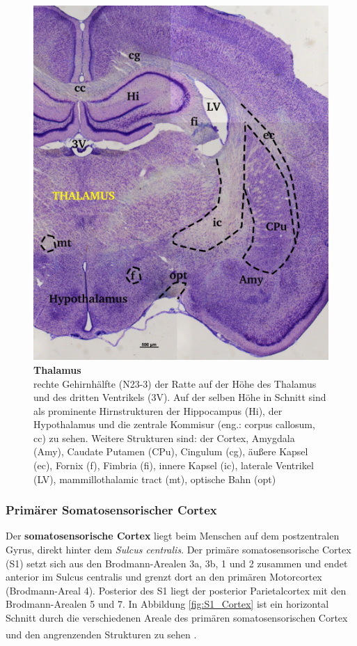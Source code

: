 \documentclass[12pt,a4paper,pdftex]{article}
\begin{document}
\begin{figure}[H]
    \centering
    \includegraphics{pictures/somatosensory/thalamus_somato.png}
    \caption[Thalamus]{\textbf{Thalamus}\\
    rechte Gehirnhälfte (N23-3) der Ratte auf der Höhe des Thalamus und des dritten Ventrikels (3V). Auf der selben Höhe in Schnitt sind als prominente Hirnstrukturen der Hippocampus (Hi), der Hypothalamus und die zentrale Kommisur (eng.: corpus callosum, cc) zu sehen. Weitere Strukturen sind: der Cortex, Amygdala (Amy), Caudate Putamen (CPu), Cingulum (cg), äußere Kapsel (ec), Fornix (f), Fimbria (fi), innere Kapsel (ic), laterale Ventrikel (LV), mammillothalamic tract (mt), optische Bahn (opt)}
    \label{fig:thalamus_somato}
\end{figure}

\subsubsection*{Primärer Somatosensorischer Cortex}
\label{subsubsec:S1}
Der \textbf{somatosensorische Cortex}  liegt beim Menschen auf dem postzentralen Gyrus, direkt hinter dem \textit{Sulcus centralis}. Der primäre somatosensorische Cortex (S1) setzt sich aus den Brodmann-Arealen 3a, 3b, 1 und 2 zusammen und endet anterior im Sulcus centralis und grenzt dort an den primären Motorcortex (Brodmann-Areal 4). Posterior des S1 liegt der posterior Parietalcortex mit den Brodmann-Arealen 5 und 7. In Abbildung \ref{fig:S1_Cortex} ist ein horizontal Schnitt durch die verschiedenen Areale des primären somatosensorischen Cortex und den angrenzenden Strukturen zu sehen \textsuperscript{\cite[23]{kandel2013principles}}. 
\end{document}
